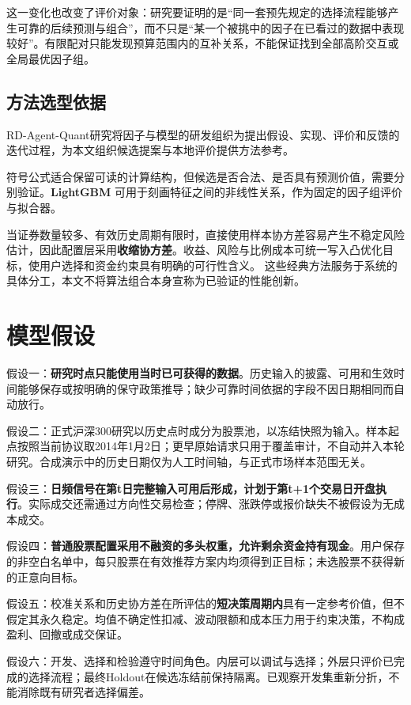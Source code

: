\documentclass[UTF8,12pt,a4paper,fontset=none]{ctexart}
\begin{document}
这一变化也改变了评价对象：研究要证明的是“同一套预先规定的选择流程能够产生可靠的后续预测与组合”，而不只是“某一个被挑中的因子在已看过的数据中表现较好”。有限配对只能发现预算范围内的互补关系，不能保证找到全部高阶交互或全局最优因子组。


\subsection{方法选型依据}

RD-Agent-Quant研究将因子与模型的研发组织为提出假设、实现、评价和反馈的迭代过程，为本文组织候选提案与本地评价提供方法参考。\cite{r5}


符号公式适合保留可读的计算结构，但候选是否合法、是否具有预测价值，需要分别验证。\textbf{LightGBM} 可用于刻画特征之间的非线性关系，作为固定的因子组评价与拟合器。\cite{r1}


当证券数量较多、有效历史周期有限时，直接使用样本协方差容易产生不稳定风险估计，因此配置层采用\textbf{收缩协方差}。收益、风险与比例成本可统一写入凸优化目标，使用户选择和资金约束具有明确的可行性含义。\cite{r2,r3} 这些经典方法服务于系统的具体分工，本文不将算法组合本身宣称为已验证的性能创新。


\section{模型假设}

假设一：\textbf{研究时点只能使用当时已可获得的数据}。历史输入的披露、可用和生效时间能够保存或按明确的保守政策推导；缺少可靠时间依据的字段不因日期相同而自动放行。


假设二：正式沪深300研究以历史点时成分为股票池，以冻结快照为输入。样本起点按照当前协议取2014年1月2日；更早原始请求只用于覆盖审计，不自动并入本轮研究。合成演示中的历史日期仅为人工时间轴，与正式市场样本范围无关。


假设三：\textbf{日频信号在第t日完整输入可用后形成，计划于第t+1个交易日开盘执行}。实际成交还需通过方向性交易检查；停牌、涨跌停或报价缺失不被假设为无成本成交。


假设四：\textbf{普通股票配置采用不融资的多头权重，允许剩余资金持有现金}。用户保存的非空白名单中，每只股票在有效推荐方案内均须得到正目标；未选股票不获得新的正意向目标。


假设五：校准关系和历史协方差在所评估的\textbf{短决策周期内}具有一定参考价值，但不假定其永久稳定。均值不确定性扣减、波动限额和成本压力用于约束决策，不构成盈利、回撤或成交保证。


假设六：开发、选择和检验遵守时间角色。内层可以调试与选择；外层只评价已完成的选择流程；最终Holdout在候选冻结前保持隔离。已观察开发集重新分折，不能消除既有研究者选择偏差。
\end{document}

